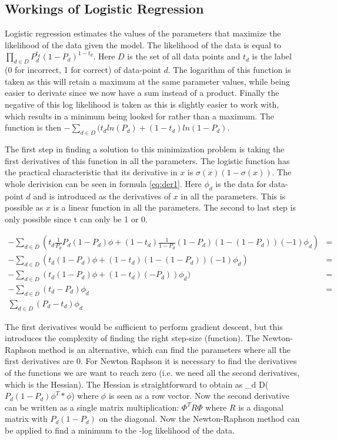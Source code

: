 \documentclass{scrartcl}
\begin{document}
\subsection{Workings of Logistic Regression}
Logistic regression estimates the values of the parameters that maximize the likelihood of the data given the model. The likelihood of the data is equal to $\prod_{d \in D} P_{d}^{t_d}  (1- P_{d})^{1-t_d} $. Here $D$ is the set of all data points and $t_{d}$ is the label (0 for incorrect, 1 for correct) of data-point $d$. The logarithm of this function is taken as this will retain a maximum at the same parameter values, while being easier to derivate since we now have a sum instead of a product. Finally the negative of this log likelihood is taken as this is slightly easier to work with, which results in a minimum being looked for rather than a maximum. The function is then $-\sum_{d \in D}(t_{d} ln(P_{d})+(1-t_{d}) ln(1-P_{d})$.

The first step in finding a solution to this minimization problem is taking the first derivatives of this function in all the parameters. The logistic function has the practical characteristic that its derivative in $x$ is $\sigma (x) (1- \sigma(x))$. The whole derivision can be seen in formula \ref{eq:der1}. Here $\phi_{d}$ is the data for data-point $d$ and is introduced as the derivatives of $x$ in all the parameters. This is possible as $x$ is a linear function in all the parameters. The second to last step is only possible since t can only be 1 or 0. 


\begin{equation}
\label{eq:der1}
\begin{split}
-\sum_{d \in D}(t_{d} \frac{1}{P_{d}} P_{d} (1-P_{d})\phi + (1-t_{d}) \frac{1}{1-P_{d}}(1-P_{d}) (1-(1-P_{d}))(-1)\phi_{d}) &=  \\
-\sum_{d \in D}(t_{d} (1-P_{d})\phi + (1-t_{d})(1-(1-P_{d}))(-1)\phi_{d}) &= \\
-\sum_{d \in D}(t_{d} (1-P_{d})\phi + (1-t_{d})(-P_{d}))\phi_{d}) & = \\
-\sum_{d \in D}(t_{d}-P_{d})\phi_{d} &= \\
\sum_{d \in D}(P_{d}-t_{d})\phi_{d} &
\end{split}
\end{equation}



The first derivatives would be sufficient to perform gradient descent, but this introduces the complexity of finding the right step-size (function). The Newton-Raphson method is an alternative, which can find the parameters where all the first derivatives are 0. For Newton Raphson it is necessary to find the derivatives of the functions we are want to reach zero (i.e. we need all the second derivatives, which is the Hessian). The Hessian is straightforward to obtain as \sum_{d \in D}($P_{d} (1-P_{d}) \phi^{T}*\phi$) where $\phi$ is seen as a row vector. Now the second derivative can be written as a single matrix multiplication: $\Phi^{T} R \Phi$ where $R$ is a diagonal matrix with $P_{d} (1-P_{d})$ on the diagonal. Now the Newton-Raphson method can be applied to find a minimum to the -log likelihood of the data.
\end{document}
